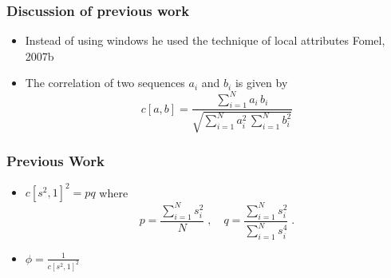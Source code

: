 \begin{frame}
   \begin{multicols}{2}
      {}
      {}
   \end{multicols}

\end{frame}
\begin{frame}
   \begin{multicols}{2}
      {}
      {}
   \end{multicols}

	
\end{frame}
\begin{frame}
 
\end{frame}

\begin{frame} \frametitle{Discussion of previous work}
  \begin{itemize}
   \item Instead of using windows he used the technique of local attributes {Fomel, 2007b}
   \item The correlation of two sequences \textit{$a_i$} and \textit{$b_i$} is given by
	  \begin{equation}
  c[a,b] = {\frac{\displaystyle \sum_{i=1}^N a_i\,b_i}{\displaystyle \sqrt{\sum_{i=1}^N a_i^2\,\sum_{i=1}^N b_i^2}}}
  \label{eq:c}
	  \end{equation}
  \end{itemize}
 
\end{frame}

\begin{frame} \frametitle{Previous Work}
  \begin{itemize}
   \item $ c[s^2,1]^2 = \textit{pq}$ where 
\begin{equation}
\label{eq:pq}
p=\frac{\displaystyle \sum_{i=1}^N s_i^2}{\displaystyle N}\;,\quad q=\frac{\displaystyle \sum_{i=1}^N s_i^2}{\displaystyle \sum_{i=1}^N s_i^4}\;.
\end{equation}

   \item $\phi = \frac{1}{c[s^2,1]^2}$
  \end{itemize}

\end{frame}
\begin{frame} 
   {}
\end{frame}


